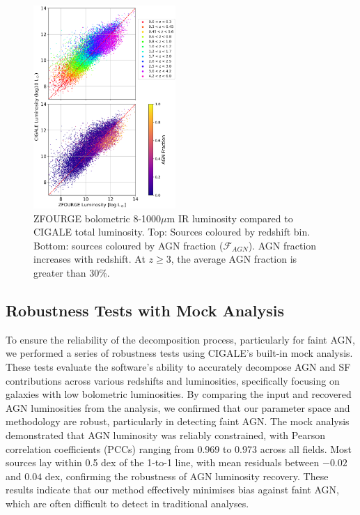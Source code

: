 \begin{figure}
    \centering
    \includegraphics[width=0.48\textwidth]{Figures/LIR_vs_LIR.png}
    \caption{ZFOURGE bolometric 8-1000$\mu$m IR luminosity compared to CIGALE total luminosity. Top: Sources coloured by redshift bin. Bottom: sources coloured by AGN fraction ($\mathcal{F}_{AGN}$). AGN fraction increases with redshift. At $z \geq 3$, the average AGN fraction is greater than 30\%.}
    \label{Fig: LIR vs LIR}
\end{figure}

\subsection{Robustness Tests with Mock Analysis} \label{Sec: Mock_Analysis}
To ensure the reliability of the decomposition process, particularly for faint AGN, we performed a series of robustness tests using CIGALE's built-in mock analysis. These tests evaluate the software's ability to accurately decompose AGN and SF contributions across various redshifts and luminosities, specifically focusing on galaxies with low bolometric luminosities. By comparing the input and recovered AGN luminosities from the analysis, we confirmed that our parameter space and methodology are robust, particularly in detecting faint AGN. The mock analysis demonstrated that AGN luminosity was reliably constrained, with Pearson correlation coefficients (PCCs) ranging from 0.969 to 0.973 across all fields. Most sources lay within 0.5 dex of the 1-to-1 line, with mean residuals between $-0.02$ and $0.04$ dex, confirming the robustness of AGN luminosity recovery. These results indicate that our method effectively minimises bias against faint AGN, which are often difficult to detect in traditional analyses.


